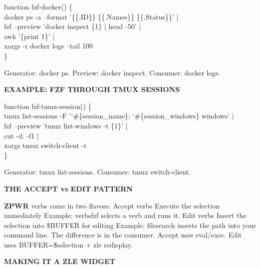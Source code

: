 \documentclass[11pt,a4paper,twoside]{book}
\begin{document}
\begin{codebox}
\color{neongreen}function fzf-docker() \{\\
\color{neongreen}docker ps -a --format '\{\{.ID\}\} \{\{.Names\}\} \{\{.Status\}\}' |\\
\color{neongreen}fzf --preview 'docker inspect \{1\} | head -50' |\\
\color{neongreen}awk '\{print 1\}' |\\
\color{neongreen}xargs -r docker logs --tail 100\\
\color{neongreen}\}\\
\end{codebox}

Generator: docker ps. Preview: docker inspect. Consumer: docker logs.


\vspace{12pt}
{\bfseries\color{neonyellow} EXAMPLE: FZF THROUGH TMUX SESSIONS}\vspace{4pt}

\begin{codebox}
\color{neongreen}function fzf-tmux-session() \{\\
\color{neongreen}tmux list-sessions -F '{\char`\#}\{session\_name\}: {\char`\#}\{session\_windows\} windows' |\\
\color{neongreen}fzf --preview 'tmux list-windows -t \{1\}' |\\
\color{neongreen}cut -d: -f1 |\\
\color{neongreen}xargs tmux switch-client -t\\
\color{neongreen}\}\\
\end{codebox}

Generator: tmux list-sessions. Consumer: tmux switch-client.


\vspace{12pt}
{\bfseries\color{neonyellow} THE ACCEPT vs EDIT PATTERN}\vspace{4pt}

\textbf{ZPWR} verbs come in two flavors: Accept verbs  Execute the selection immediately Example: verbsfzf selects a verb and runs it. Edit verbs    Insert the selection into \$BUFFER for editing Example: filesearch inserts the path into your command line. The difference is in the consumer. Accept uses eval/exec. Edit uses BUFFER=\$selection + zle redisplay.


\vspace{12pt}
{\bfseries\color{neonyellow} MAKING IT A ZLE WIDGET}\vspace{4pt}
\end{document}
